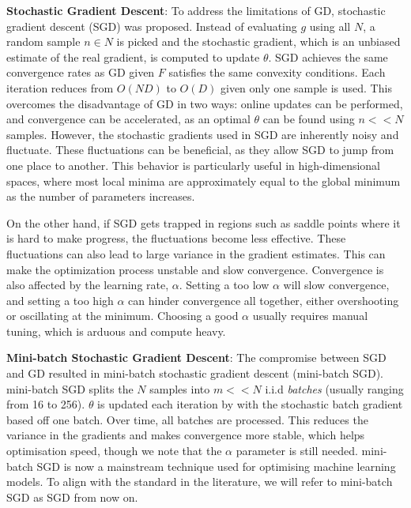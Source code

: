 \textbf{Stochastic Gradient Descent}: To address the limitations of GD, stochastic gradient descent (SGD) was proposed. Instead of evaluating $g$ using all $N$, a random sample $n \in N$ is picked and the stochastic gradient, which is an unbiased estimate of the real gradient, is computed to update $\theta$. SGD achieves the same convergence rates as GD given $F$ satisfies the same convexity conditions. Each iteration reduces from $O(ND)$ to $O(D)$ given only one sample is used.
This overcomes the disadvantage of GD in two ways: online updates can be performed, and convergence can be accelerated, as an optimal $\theta$ can be found using $n << N$ samples. However, the stochastic gradients used in SGD are inherently noisy and fluctuate. These fluctuations can be beneficial, as they allow SGD to jump from one place to another. This behavior is particularly useful in high-dimensional spaces, where most local minima are approximately equal to the global minimum as the number of parameters increases.

On the other hand, if SGD gets trapped in regions such as saddle points where it is hard to make progress, the fluctuations become less effective. These fluctuations can also lead to large variance in the gradient estimates. This can make the optimization process unstable and slow convergence. Convergence is also affected by the learning rate, $\alpha$. Setting a too low $\alpha$ will slow convergence, and setting a too high $\alpha$ can hinder convergence all together, either overshooting or oscillating at the minimum. Choosing a good $\alpha$ usually requires manual tuning, which is arduous and compute heavy.

\textbf{Mini-batch Stochastic Gradient Descent}: The compromise between SGD and GD resulted in mini-batch stochastic gradient descent (mini-batch SGD). mini-batch SGD splits the $N$ samples into $m << N$ i.i.d \textit{batches} (usually ranging from 16 to 256). $\theta$ is updated each iteration by with the stochastic batch gradient based off one batch. Over time, all batches are processed. This reduces the variance in the gradients and makes convergence more stable, which helps optimisation speed, though we note that the $\alpha$ parameter is still needed. mini-batch SGD is now a mainstream technique used for optimising machine learning models. To align with the standard in the literature, we will refer to mini-batch SGD as SGD from now on.

